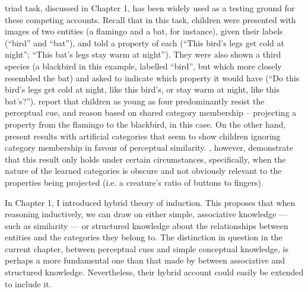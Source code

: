  triad task,
discussed in Chapter 1,
has been widely used as a testing ground
for these competing accounts.
Recall that in this task,
children were presented with images of two entities
(a flamingo and a bat, for instance),
given their labels (``bird'' and ``bat''),
and told a property of each
(``This bird's legs get cold at night'';
``This bat's legs stay warm at night'').
They were also shown a third species
(a blackbird in this example, labelled ``bird'',
but which more closely resembled the bat)
and asked to indicate which property it would have
(``Do this bird's legs get cold at night, like this bird's,
or stay warm at night, like this bat's?'').
\citet{Gelman1986} report that children as young as four
predominantly resist the perceptual cue,
and reason based on shared category membership --
projecting a property from the flamingo to the blackbird,
in this case.
On the other hand, \citet{Sloutsky2007} present results with artificial categories
that seem to show children ignoring category membership
in favour of perceptual similarity.
\citet{Gelman2013c}, however, demonstrate that
this result only holds under certain circumstances,
specifically, when the nature of the learned categories is obscure
and not obviously relevant to the properties being projected
(i.e. a creature's ratio of buttons to fingers).

In Chapter 1, I introduced  hybrid theory of induction.
This proposes that when reasoning inductively,
we can draw on either simple, associative knowledge --- such as similarity ---
or structured knowledge about the relationships between
entities and the categories they belong to.
The distinction in question in the current chapter,
between perceptual cues and simple conceptual knowledge,
is perhaps a more fundamental one than that made by
\citet{Bright2014a} between associative and structured knowledge.
Nevertheless, their hybrid account could easily
be extended to include it.

